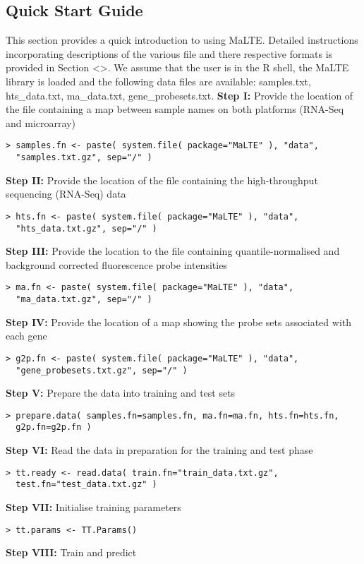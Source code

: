 \documentclass[a4paper,12pt]{article}
\begin{document}
\subsection{Quick Start Guide}
This section provides a quick introduction to using MaLTE. Detailed instructions incorporating descriptions of the various file and there respective formats is provided in Section \textless\textgreater. We assume that the user is in the R shell, the MaLTE library is loaded and the following data files are available: samples.txt, hts\_data.txt, ma\_data.txt, gene\_probesets.txt.
\textbf{Step I:} Provide the location of the file containing a map between sample names on both platforms (RNA-Seq and microarray)
\begin{verbatim}
> samples.fn <- paste( system.file( package="MaLTE" ), "data", 
  "samples.txt.gz", sep="/" )
\end{verbatim}
\textbf{Step II:} Provide the location of the file containing the high-throughput sequencing (RNA-Seq) data
\begin{verbatim}
> hts.fn <- paste( system.file( package="MaLTE" ), "data", 
  "hts_data.txt.gz", sep="/" )
\end{verbatim}
\textbf{Step III:} Provide the location to the file containing quantile-normalised and background corrected fluorescence probe intensities
\begin{verbatim}
> ma.fn <- paste( system.file( package="MaLTE" ), "data", 
  "ma_data.txt.gz", sep="/" )
\end{verbatim}
\textbf{Step IV:} Provide the location of a map showing the probe sets associated with each gene
\begin{verbatim}
> g2p.fn <- paste( system.file( package="MaLTE" ), "data", 
  "gene_probesets.txt.gz", sep="/" )
\end{verbatim}
\textbf{Step V:} Prepare the data into training and test sets
\begin{verbatim}
> prepare.data( samples.fn=samples.fn, ma.fn=ma.fn, hts.fn=hts.fn, 
  g2p.fn=g2p.fn )
\end{verbatim}
\textbf{Step VI:} Read the data in preparation for the training and test phase
\begin{verbatim}
> tt.ready <- read.data( train.fn="train_data.txt.gz", 
  test.fn="test_data.txt.gz" )
\end{verbatim}
\textbf{Step VII:} Initialise training parameters
\begin{verbatim}
> tt.params <- TT.Params()
\end{verbatim}
\textbf{Step VIII:} Train and predict
\end{document}
